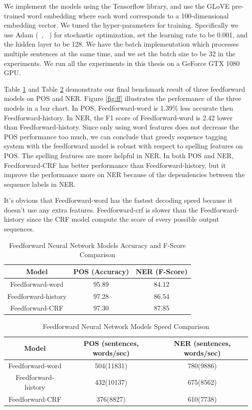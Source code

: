 \documentclass{sfuthesis}
\begin{document}
 
We implement the models using the Tensorflow library, and use the GLoVE pre-trained word embedding where each word corresponds to a 100-dimensional embedding vector. We tuned the hyper-parameters for training. Specifically we use Adam (~\citeauthor{kingma2014adam}, ~\citeyear{kingma2014adam}) for stochastic optimization, set the learning rate to be 0.001, and the hidden layer to be 128. We have the batch implementation which processes multiple sentences at the same time, and we set the batch size to be 32 in the experiments. We run all the experiments in this thesis on a GeForce GTX 1080 GPU. 

Table \ref{table:ff-table1} and Table \ref{table:ff-tabel2} demonstrate our final benchmark result of three feedforward models on POS and NER. Figure \ref{fig:ff} illustrates the performance of the three models in a bar chart. In POS, Feedforward-word is 1.39\% less accurate then Feedforward-history. In NER, the F1 score of Feedforward-word is 2.42 lower than Feedforward-history. Since only using word features does not decrease the POS performance too much, we can conclude that greedy sequence tagging system with the feedforward model is robust with respect to spelling features on POS. The spelling features are more helpful in NER. In both POS and NER, Feedforward-CRF has better performance than Feedforward-history, but it improve the performance more on NER because of the dependencies between the sequence labels in NER.

It's obvious that Feedforward-word has the fastest decoding speed because it doesn't use any extra features. Feedforward-crf is slower than the Feedforward-history since the CRF model compute the score of every possible output sequences.

\begin{table}[]
\centering
\caption{Feedforward Neural Network Models Accuracy and F-Score Comparison}
\label{table:ff-table1}
\begin{tabular}{|c|c|c|}
\hline
Model         & POS (Accuracy)  & NER (F-Score)       \\ \hline
Feedforward-word    & 95.89          &   84.12     \\ \hline
Feedforward-history & 97.28     & 86.54        \\ \hline
Feedforward-CRF     & 97.30          &   87.85     \\ \hline
\end{tabular}
\end{table}

\begin{table}[]
\centering
\caption{Feedforward Neural Network Models Speed Comparison}
\label{table:ff-tabel2}
\begin{tabular}{|c|c|c|}
\hline
Model       & POS  (sentences, words/sec)  & NER  (sentences, words/sec)      \\ \hline
Feedforward-word    & 504(11831)     & 780(9886)    \\ \hline
Feedforward-history & 432(10137)     & 675(8562)     \\ \hline
Feedforward-CRF    & 376(8827)     & 610(7738)     \\ \hline
\end{tabular}
\end{table}
\end{document}
